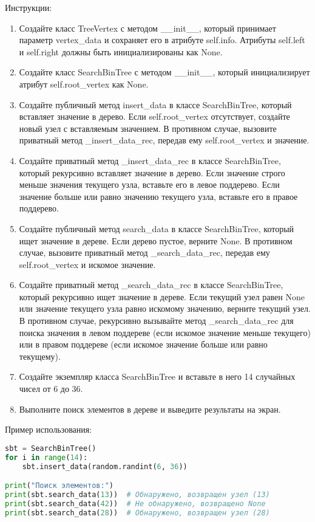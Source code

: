 \begin{enumerate}
Инструкции:
\begin{enumerate}
    \item Создайте класс TreeVertex с методом \_\_init\_\_, который принимает параметр vertex\_data и сохраняет его в атрибуте self.info. Атрибуты self.left и self.right должны быть инициализированы как None.
    \item Создайте класс SearchBinTree с методом \_\_init\_\_, который инициализирует атрибут self.root\_vertex как None.
    \item Создайте публичный метод insert\_data в классе SearchBinTree, который вставляет значение в дерево. Если self.root\_vertex отсутствует, создайте новый узел с вставляемым значением. В противном случае, вызовите приватный метод \_insert\_data\_rec, передав ему self.root\_vertex и значение.
    \item Создайте приватный метод \_insert\_data\_rec в классе SearchBinTree, который рекурсивно вставляет значение в дерево. Если значение строго меньше значения текущего узла, вставьте его в левое поддерево. Если значение больше или равно значению текущего узла, вставьте его в правое поддерево.
    \item Создайте публичный метод search\_data в классе SearchBinTree, который ищет значение в дереве. Если дерево пустое, верните None. В противном случае, вызовите приватный метод \_search\_data\_rec, передав ему self.root\_vertex и искомое значение.
    \item Создайте приватный метод \_search\_data\_rec в классе SearchBinTree, который рекурсивно ищет значение в дереве. Если текущий узел равен None или значение текущего узла равно искомому значению, верните текущий узел. В противном случае, рекурсивно вызывайте метод \_search\_data\_rec для поиска значения в левом поддереве (если искомое значение меньше текущего) или в правом поддереве (если искомое значение больше или равно текущему).
    \item Создайте экземпляр класса SearchBinTree и вставьте в него 14 случайных чисел от 6 до 36.
    \item Выполните поиск элементов в дереве и выведите результаты на экран.
\end{enumerate}

Пример использования:
\begin{lstlisting}[language=Python]
sbt = SearchBinTree()
for i in range(14):
    sbt.insert_data(random.randint(6, 36))

print("Поиск элементов:")
print(sbt.search_data(13))  # Обнаружено, возвращен узел (13)
print(sbt.search_data(42))  # Не обнаружено, возвращено None
print(sbt.search_data(28))  # Обнаружено, возвращен узел (28)
\end{lstlisting}


\end{enumerate}

